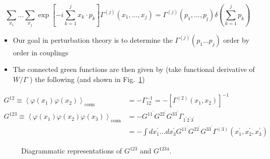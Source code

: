 \begin{equation}
\sum_{x_{1}} \ldots \sum_{x_j} \exp \left[-i \sum_{k=1}^{j} x_{k} \cdot p_{k}\right] \Gamma^{(j)}\left(x_{1}, \ldots, x_{j}\right)=\Gamma^{(j)}\left(p_{1}, \ldots, p_{\jmath}\right) \delta\left(\sum_{k=1}^{j} p_{k}\right)
\end{equation}

\begin{itemize}
  \item Our goal in perturbation theory is to determine the \(\Gamma^{(j)}\left(p_{1} \ldots p_{j}\right)\) order by order in couplings
  \item The connected green functions are then given by (take functional derivative of \(W / \Gamma\) ) the following (and shown in Fig.~\ref{fig:weak_3_4_pt})
\end{itemize}

\begin{equation}
\begin{aligned}
G^{12} \equiv\left\langle\varphi\left(x_{1}\right)\varphi\left(x_{2}\right)\right\rangle_{\text{conn}} & =-\Gamma_{12}^{-1}=-\left[\Gamma^{(2)}\left(x_{1}, x_{2}\right)\right]^{-1} \\
G^{123} \equiv\left\langle\varphi\left(x_{1}\right) \varphi\left(x_{2}\right) \varphi\left(x_{3}\right)\right\rangle_{\text{conn}} & =-G^{11^\prime} G^{22^{\prime}} G^{33^{\prime}} \Gamma_{1^{\prime} 2^{\prime} 3^{\prime}} \\
& =-\int d x_{1}^{\prime} \ldots  d x_{3}^{\prime} G^{1 1^{\prime}} G^{2 2^{\prime}} G^{3 3^{\prime}} \Gamma^{(3)}\left(x_{1}^{\prime}, x_{2}^{\prime}, x_{3}^{\prime}\right)
\end{aligned}
\end{equation}

\begin{figure}
    \centering
    \caption{Diagrammatic representations of $G^{123}$ and $G^{1234}$.
    \label{fig:weak_3_4_pt}}
\end{figure}


